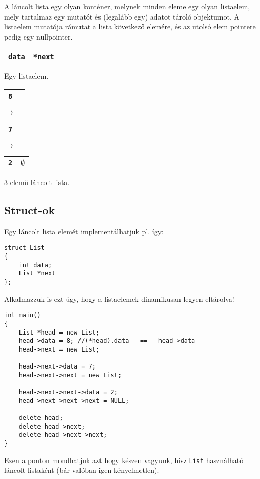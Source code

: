 \documentclass[a4paper,11.5pt]{article}
\begin{document}
	\smallskip
	A láncolt lista egy olyan konténer, melynek minden eleme egy olyan listaelem, mely tartalmaz egy mutatót és (legalább egy) adatot tároló objektumot. A listaelem mutatója rámutat a lista következő elemére, és az utolsó elem pointere pedig egy nullpointer.
	\begin{center}
		\begin{tabular}{|c|c|}
			\hline
			\texttt{data}&\texttt{*next}\\
			\hline
		\end{tabular}
		\smallskip
		
		Egy listaelem.
		\medskip
		
		\begin{tabular}{|c|c|}
			\hline
			\texttt{8}&\texttt{}\\
			\hline
		\end{tabular}$\rightarrow$
		\begin{tabular}{|c|c|}
			\hline
			\texttt{7}&\texttt{}\\
			\hline
		\end{tabular}$\rightarrow$
		\begin{tabular}{|c|c|}
			\hline
			\texttt{2}&\texttt{$\emptyset$}\\
			\hline
		\end{tabular}
		\smallskip
		
		3 elemű láncolt lista.
	\end{center}
	\subsection{Struct-ok}
	Egy láncolt lista elemét implementálhatjuk pl. így:
	\begin{lstlisting}
struct List
{
	int data;
	List *next
};
	\end{lstlisting}
	Alkalmazzuk is ezt úgy, hogy  a listaelemek dinamikusan legyen eltárolva!
	\begin{lstlisting}
int main()
{
	List *head = new List;
	head->data = 8; //(*head).data   ==   head->data
	head->next = new List;
	
	head->next->data = 7;
	head->next->next = new List;
	
	head->next->next->data = 2;
	head->next->next->next = NULL;
	
	delete head;
	delete head->next;
	delete head->next->next;
}
	\end{lstlisting}
	Ezen a ponton mondhatjuk azt hogy készen vagyunk, hisz \texttt{List} használható láncolt listaként (bár valóban igen kényelmetlen).
	\medskip
	
\end{document}
